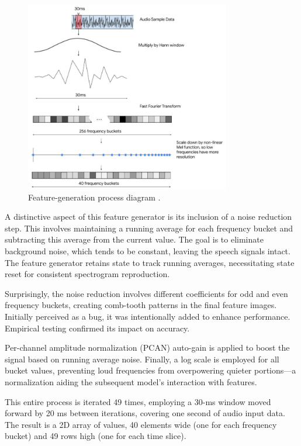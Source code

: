 \begin{figure}[h!]
	\centering
	\includegraphics[width=0.8\textwidth]{Images/KDDProcess/featureGeneration}
	\caption{Feature-generation process diagram \cite{Warden:2019}.} \label{fig:featureGeneration}
\end{figure}

A distinctive aspect of this feature generator is its inclusion of a noise reduction step. This involves maintaining a running average for each frequency bucket and subtracting this average from the current value. The goal is to eliminate background noise, which tends to be constant, leaving the speech signals intact. The feature generator retains state to track running averages, necessitating state reset for consistent spectrogram reproduction.

Surprisingly, the noise reduction involves different coefficients for odd and even frequency buckets, creating comb-tooth patterns in the final feature images. Initially perceived as a bug, it was intentionally added to enhance performance. Empirical testing confirmed its impact on accuracy.

Per-channel amplitude normalization (PCAN) auto-gain is applied to boost the signal based on running average noise. Finally, a log scale is employed for all bucket values, preventing loud frequencies from overpowering quieter portions—a normalization aiding the subsequent model's interaction with features.

This entire process is iterated 49 times, employing a 30-ms window moved forward by 20 ms between iterations, covering one second of audio input data. The result is a 2D array of values, 40 elements wide (one for each frequency bucket) and 49 rows high (one for each time slice).


